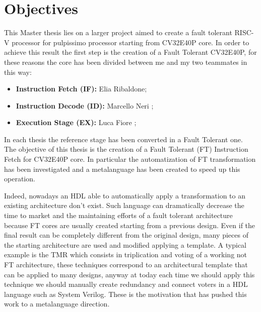 {	\section{Objectives}{
        \label{sec:Objectives}
        This Master thesis lies on a larger project aimed to create a fault tolerant RISC-V processor for pulpissimo processor starting from CV32E40P core. In order to achieve this result the first step is the creation of a Fault Tolerant CV32E40P, for these reasons the core has been divided between me and my two teammates in this way:
        \begin{itemize}
            \item \textbf{Instruction Fetch (IF):} Elia Ribaldone;
            \item \textbf{Instruction Decode (ID):} Marcello Neri ;
            \item \textbf{Execution Stage (EX):} Luca Fiore ;
        \end{itemize}
        In each thesis the reference stage has been converted in a Fault Tolerant one. \\
        
        The objective of this thesis is the creation of a Fault Tolerant (FT) Instruction Fetch for CV32E40P core. In particular the automatization of FT transformation has been investigated and a metalanguage has been created to speed up this operation.
        
        Indeed, nowadays an HDL able to automatically apply a transformation to an existing architecture don't exist. Such language can dramatically decrease the time to market and the maintaining efforts of a fault tolerant architecture because FT cores are usually created starting from a previous design. Even if the final result can be completely different from the original design, many pieces of the starting architecture are used and modified applying a template. A typical example is the TMR which consists in triplication and voting of a working not FT architecture, these techniques correspond to an architectural template that can be applied to many designs, anyway at today each time we should apply this technique we should manually create redundancy and connect voters in a HDL language such as System Verilog. These is the motivation that has pushed this work to a metalanguage direction.
    
	}
}
